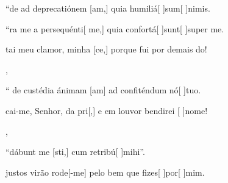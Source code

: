 {  {\item {}``de ad deprecatiónem [am,] quia humiliá[ ]{sum}[ ]{ni}mis.~\Antiphona
      \item {}``ra me a persequénti[ me,] quia confortá[ ]{sunt}[ ]{su}per me.~\Antiphona}%
    {\item {}tai meu clamor, minha [ce,] porque fui por demais \-do!~\Antiphona},
  {\item {}`` de custédia ánimam [am] ad confitén\-dum nó[ ]{tu}o.~\Antiphona}%
    {\item {}cai-me, Senhor, da pri[,] e em louvor bendirei [ ]{no}me!~\Antiphona},
  {\item {}``dábunt me [sti,] cum retribú[ ]{mi}\-hi''.~\Antiphona}%
    {\item {} justos virão rode[-me] pelo bem que fizes[ ]{por}[ ]{mim}.~\Antiphona}
}